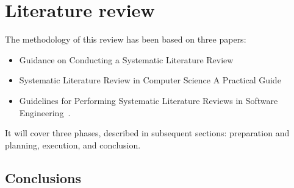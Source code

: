 \section{Literature review}\label{sec:literature-review}

The methodology of this review has been based on three papers:
\begin{itemize}
    \item Guidance on Conducting a Systematic Literature Review~\cite{xiao_guidance_2019}
    \item Systematic Literature Review in Computer Science \textendash A Practical Guide~\cite{neiva_systematic_2016}
    \item Guidelines for Performing Systematic Literature Reviews in Software Engineering~\cite{kitchenham_guidelines_2007}.
\end{itemize}
It will cover three phases, described in subsequent sections: preparation and planning, execution, and conclusion.







\subsection{Conclusions}\label{subsec:conclusions}
